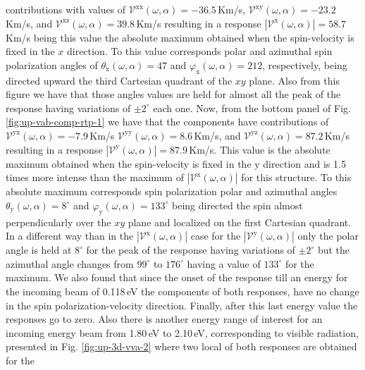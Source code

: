 \documentclass[prb,11pt,tightenlines,twocolumn,aps]{revtex4-1}
\begin{document}
contributions with values of
% 
$\mathcal{V}^{\mathrm{xx}}(\omega,\alpha)=-36.5$\,Km/s,
$\mathcal{V}^{\mathrm{xy}}(\omega,\alpha)=-23.2$\,Km/s, and
$\mathcal{V}^{\mathrm{xz}}(\omega,\alpha)= 39.8$\,Km/s resulting in a response
$|\mathcal{V}^{\mathrm{x}}(\omega,\alpha)|=58.7$\,Km/s being this value the
absolute maximum obtained when the spin-velocity is fixed in the $x$ direction.
% 
{\color{red} To this value corresponds polar and azimuthal spin polarization
angles of $\theta_{\mathrm{x}}(\omega,\alpha)=47$ and
$\varphi_{\mathrm{x}}(\omega,\alpha)=212$, respectively, being directed upward
the third Cartesian quadrant of the $xy$ plane.
% 
Also from this figure we have that those angles values are held for almost all
the peak of the response having variations of $\pm 2^{\circ}$ each one.
% 
Now, from the bottom panel of Fig. \ref{fig:up-vab-comp-rtp-1} we have that the
components have contributions of
% 
$\mathcal{V}^{\mathrm{yx}}(\omega,\alpha)= -7.9$\,Km/s 
$\mathcal{V}^{\mathrm{yy}}(\omega,\alpha)=  8.6$\,Km/s, and
$\mathcal{V}^{\mathrm{yz}}(\omega,\alpha)= 87.2$\,Km/s 
% 
resulting in a response $|\mathcal{V}^{\mathrm{y}}(\omega,\alpha)|=87.9$\,Km/s.
This value is the absolute maximum obtained when the spin-velocity is fixed in
the $\mathrm{y}$ direction and is 1.5 times more intense than the maximum of
$|\mathcal{V}^{\mathrm{x}}(\omega,\alpha)|$ for this structure. To this absolute
maximum corresponds spin polarization polar and azimuthal angles
$\theta_{\mathrm{y}}(\omega,\alpha) = 8^{\circ}$ and
$\varphi_{\mathrm{y}}(\omega,\alpha) = 133^{\circ}$ being directed the spin
almost perpendicularly over the $xy$ plane and  localized on the first Cartesian
quadrant.}
% 
In a different way than in the $|\mathcal{V}^{\mathrm{x}}(\omega,\alpha)|$ case
for the $|\mathcal{V}^{\mathrm{y}}(\omega,\alpha)|$ only the polar angle is held
at $8^{\circ}$ for the peak of the response having variations of $\pm 2^{\circ}$
but the azimuthal angle changes from $99^{\circ}$ to $176^{\circ}$ having a
value of $133^{\circ}$ for the maximum.
% 
We also found that since the onset of the response till an energy for the
incoming beam of 0.118\,eV the components of both responses, have no change in
the spin polarization-velocity direction. Finally, after this last energy value
the responses go to zero.
Also there is another energy range of interest for an incoming energy beam from
1.80\,eV to 2.10\,eV, corresponding to visible radiation, presented in Fig.
\ref{fig:up-3d-vva-2} where two local of both responses are obtained for the
\end{document}
